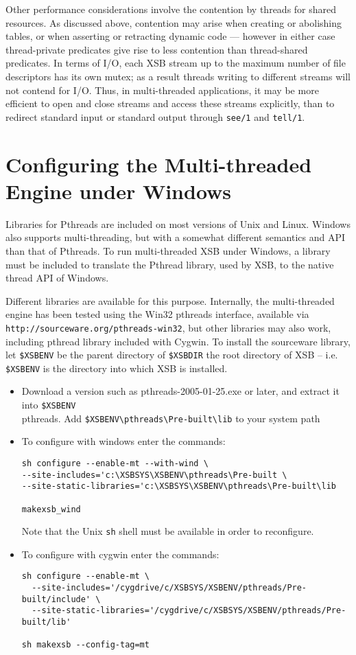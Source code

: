 Other performance considerations involve the contention by threads for
shared resources.  As discussed above, contention may arise when
creating or abolishing tables, or when asserting or retracting dynamic
code --- however in either case thread-private predicates give rise to
less contention than thread-shared predicates.  In terms of I/O, each
XSB stream up to the maximum number of file descriptors has its own
mutex; as a result threads writing to different streams will not
contend for I/O.  Thus, in multi-threaded applications, it may be more
efficient to open and close streams and access these streams
explicitly, than to redirect standard input or standard output through
{\tt see/1} and {\tt tell/1}.

\section{Configuring the Multi-threaded Engine under Windows}

Libraries for Pthreads are included on most versions of Unix and
Linux.  Windows also supports multi-threading, but with a somewhat
different semantics and API than that of Pthreads.  To run
multi-threaded XSB under Windows, a library must be included to
translate the Pthread library, used by XSB, to the native thread API
of Windows.

Different libraries are available for this purpose.  Internally, the
multi-threaded engine has been tested using the Win32 pthreads
interface, available via {\tt http://sourceware.org/pthreads-win32},
but other libraries may also work, including pthread library included
with Cygwin.  To install the sourceware library, let {\tt \$XSBENV} be
the parent directory of {\tt \$XSBDIR} the root directory of XSB --
i.e. {\tt \$XSBENV} is the directory into which XSB is installed.

\begin{itemize}
\item Download a version such as pthreads-2005-01-25.exe or later, and
  extract it into {\tt \$XSBENV}\\pthreads.  Add
  \verb|$XSBENV\pthreads\Pre-built\lib| to your system path

\item To configure with windows enter the commands: 
\begin{verbatim}
sh configure --enable-mt --with-wind \
--site-includes='c:\XSBSYS\XSBENV\pthreads\Pre-built \
--site-static-libraries='c:\XSBSYS\XSBENV\pthreads\Pre-built\lib

makexsb_wind
\end{verbatim}
Note that the Unix {\tt sh} shell must be available in order to
reconfigure.

\item To configure with cygwin enter the commands:
\begin{verbatim}
sh configure --enable-mt \
  --site-includes='/cygdrive/c/XSBSYS/XSBENV/pthreads/Pre-built/include' \
  --site-static-libraries='/cygdrive/c/XSBSYS/XSBENV/pthreads/Pre-built/lib'

sh makexsb --config-tag=mt
\end{verbatim}

\end{itemize}

